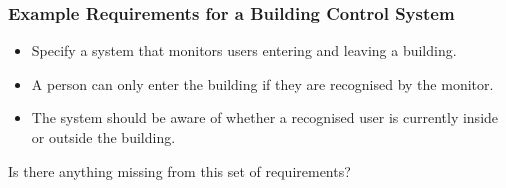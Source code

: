 \documentclass{beamer}
\begin{document}
\begin{frame}

\frametitle{Example  Requirements for a Building Control System}

\begin{itemize} \setlength{\itemsep}{6pt}
\item Specify a system that monitors users entering and leaving a
building. 
\item A person can only enter the building if they are
recognised by the monitor. 
\item The system should be aware of
whether a recognised
     user is currently inside or outside the building.

\end{itemize}

Is there anything missing from this set of requirements?

\end{frame}





\begin{frame}
%
%
\ENDC

~\\

%
%
%
\end{frame}
\end{document}
